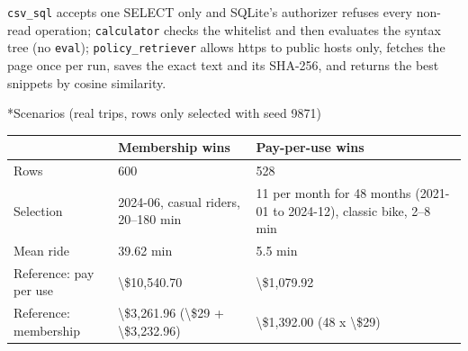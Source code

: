 \documentclass[11pt]{article}
\makeatletter
\renewcommand\subsection{\@startsection{subsection}{2}{\z@}{-2.2ex \@plus -1ex \@minus -.2ex}{0.8ex \@plus.2ex}{\normalfont\fontsize{12}{14.5}\selectfont\bfseries}}
\makeatother
\begin{document}
\endgroup
\texttt{csv\_\allowbreak{}sql} accepts one SELECT only and SQLite's authorizer refuses every non-read operation; \texttt{calculator} checks the whitelist and then evaluates the syntax tree (no \texttt{eval}); \texttt{policy\_\allowbreak{}retriever} allows https to public hosts only, fetches the page once per run, saves the exact text and its SHA-256, and returns the best snippets by cosine similarity.

\subsection*{Scenarios (real trips, rows only selected with seed 9871)}
\begin{center}
{\small
\begin{tabular}{p{1.3in}p{2.2in}p{2.6in}}
\toprule
\textbf{} & \textbf{Membership wins} & \textbf{Pay-per-use wins} \\
\midrule
Rows & 600 & 528 \\
Selection & 2024-06, casual riders, 20--180 min & 11 per month for 48 months (2021-01 to 2024-12), classic bike, 2--8 min \\
Mean ride & 39.62 min & 5.5 min \\
Reference: pay per use & \textbackslash{}\$10,540.70 & \textbackslash{}\$1,079.92 \\
Reference: membership & \textbackslash{}\$3,261.96 (\textbackslash{}\$29 + \textbackslash{}\$3,232.96) & \textbackslash{}\$1,392.00 (48 x \textbackslash{}\$29) \\
\bottomrule
\end{tabular}}
\end{center}
\end{document}
